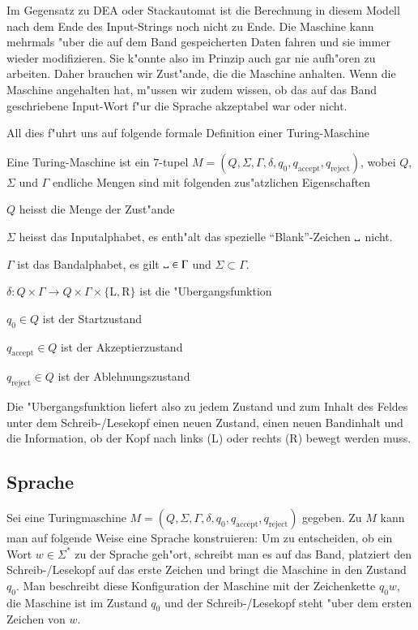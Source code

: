Im Gegensatz zu DEA oder Stackautomat ist die Berechnung in diesem
Modell nach dem Ende des Input-Strings noch nicht zu Ende. Die Maschine
kann mehrmals "uber die auf dem Band gespeicherten Daten fahren und
sie immer wieder modifizieren. Sie k"onnte also im Prinzip auch
gar nie aufh"oren zu arbeiten. Daher brauchen wir Zust"ande, die
die Maschine anhalten. Wenn die Maschine angehalten hat, m"ussen wir
zudem wissen, ob das auf das Band geschriebene Input-Wort f"ur die
Sprache akzeptabel war oder nicht.

All dies f"uhrt uns auf folgende formale Definition einer Turing-Maschine
\begin{definition}
Eine Turing-Maschine ist ein $7$-tupel
$M=(Q,\Sigma,\Gamma,\delta,q_0,q_{\text{accept}},q_{\text{reject}})$,
wobei $Q$, $\Sigma$ und $\Gamma$ endliche Mengen sind mit folgenden
zus"atzlichen Eigenschaften
\begin{compactenum}
\item $Q$ heisst die Menge der Zust"ande
\item $\Sigma$ heisst das Inputalphabet, es enth"alt das spezielle
``Blank''-Zeichen $\blank$ nicht.
\item $\Gamma$ ist das Bandalphabet, es gilt $\blank\in\Gamma$ und
$\Sigma\subset\Gamma$.
\item $\delta\colon Q\times \Gamma\to Q\times\Gamma\times\{\text{L},\text{R}\}$
ist die "Ubergangsfunktion
\item $q_0\in Q$ ist der Startzustand
\item $q_{\text{accept}}\in Q$ ist der Akzeptierzustand
\item $q_{\text{reject}}\in Q$ ist der Ablehnungszustand
\end{compactenum}
\end{definition}
Die "Ubergangsfunktion liefert also zu jedem Zustand und zum
Inhalt des Feldes unter dem Schreib-/Lesekopf einen neuen
Zustand, einen neuen Bandinhalt und die Information, ob
der Kopf nach links (L) oder rechts (R) bewegt werden muss.

\subsection{Sprache}
Sei eine Turingmaschine
$M=(Q,\Sigma,\Gamma,\delta,q_0,q_{\text{accept}},q_{\text{reject}})$
gegeben.
Zu $M$ kann man auf folgende Weise eine Sprache konstruieren:
Um zu entscheiden, ob ein Wort $w\in\Sigma^*$
zu der Sprache geh"ort,
schreibt man es auf das Band, platziert den Schreib-/Lesekopf auf
das erste Zeichen und bringt die Maschine in den Zustand $q_0$.
Man beschreibt diese Konfiguration der Maschine mit der Zeichenkette
$q_0w$, die Maschine ist im Zustand $q_0$ und der Schreib-/Lesekopf
steht "uber dem ersten Zeichen von $w$.

